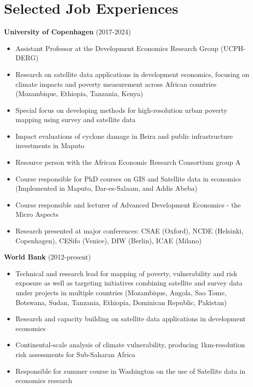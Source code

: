 \documentclass[a4paper,11pt]{article}
\begin{document}
\section{Selected Job Experiences}
\vspace{0.2cm}
\textbf{University of Copenhagen} (2017-2024)
\begin{itemize}[leftmargin=*, itemsep=0pt]
\item Assistant Professor at the Development Economics Research Group (UCPH-DERG)
\item Research on satellite data applications in development economics, focusing on climate impacts and poverty measurement across African countries (Mozambique, Ethiopia, Tanzania, Kenya)
\item Special focus on developing methods for high-resolution urban poverty mapping using survey and satellite data
\item Impact evaluations of cyclone damage in Beira and public infrastructure investments in Maputo
\item Resource person with the African Economic Research Consortium group A
\item Course responsible for PhD courses on GIS and Satellite data in economics (Implemented in Maputo, Dar-es-Salaam, and Addis Abeba)
\item Course responsible and lecturer of Advanced Development Economics - the Micro Aspects
\item Research presented at major conferences: CSAE (Oxford), NCDE (Helsinki, Copenhagen), CESifo (Venice), DIW (Berlin), ICAE (Milano)
\end{itemize}
\textbf{World Bank} (2012-present)
\begin{itemize}[leftmargin=*, itemsep=0pt]

\item Technical and research lead for mapping of poverty, vulnerability and risk exposure as well as targeting initiatives combining satellite and survey data under projects in multiple countries (Mozambique, Angola, Sao Tome, Botswana, Sudan, Tanzania, Ethiopia, Dominican Republic, Pakistan)
\item Research and capacity building on satellite data applications in development economics
\item Continental-scale analysis of climate vulnerability, producing 1km-resolution risk assessments for Sub-Saharan Africa
\item Responsible for summer course in Washington on the use of Satellite data in economics research
\end{itemize}
\end{document}
